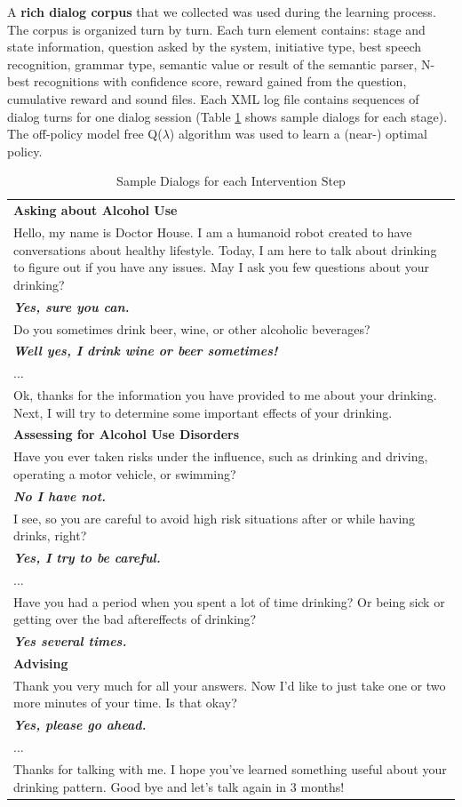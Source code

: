 \documentclass[letterpaper]{article}
\begin{document}
A {\bf rich dialog corpus} that we collected was used during the learning process. The corpus is organized turn by 
turn. Each turn element contains: stage and state information, question asked by the system,  
initiative type,  best speech recognition, grammar type, semantic value or result of the semantic 
parser, N-best recognitions with confidence score, reward gained from the question, cumulative 
reward and sound files. Each XML log file contains sequences of dialog turns for one dialog 
session (Table \ref{sampleDialog} shows  sample dialogs for each stage). The off-policy model free 
Q($\lambda$) algorithm was used to learn a (near-) optimal policy.

\begin{table}[!h]
\caption{Sample Dialogs for each Intervention Step}
\label{sampleDialog}
\begin{tabular}{ p{80mm}  } \hline
    \textbf{Asking about Alcohol Use} \\
    Hello, my name is Doctor House. I am a humanoid robot created to have conversations about 
healthy lifestyle. Today, I am here to talk about drinking to figure out if you have any issues.  
May I ask you few questions about your drinking? \\
\bf{\em{Yes, sure you can.}}\\
Do you sometimes drink beer, wine, or other alcoholic beverages?\\
\bf{\em{Well yes, I drink wine or beer sometimes!}} \\
$\ldots$\\
Ok, thanks for the information you have provided to me about your drinking. Next, I will try to 
determine some important effects of your drinking. \\
    \hline
    \textbf{Assessing for Alcohol Use Disorders} \\
    Have you ever taken risks under the influence, such as drinking and driving, operating a motor 
vehicle, or swimming?\\
\bf{\em{No I have not.}} \\
I see, so you are careful to avoid high risk situations after or while having drinks, right?\\
\bf{\em{Yes, I try to be careful.}} \\
$\ldots$\\
Have you had a period when you spent a lot of time drinking? Or being sick or getting over the bad 
aftereffects of drinking? \\
\bf{\em{Yes several times.}} \\
    \hline
    \textbf{Advising} \\
     Thank you very much for all your answers. Now I'd like to just take one or two more minutes of 
your time. Is that okay? \\
\bf{\em{Yes, please go ahead.}}\\
$\ldots$\\
Thanks for talking with me. I hope you've learned something useful about your drinking pattern.  
Good bye and let's talk again in 3 months! \\
    \hline
\end{tabular}
\end{table}
\end{document}
